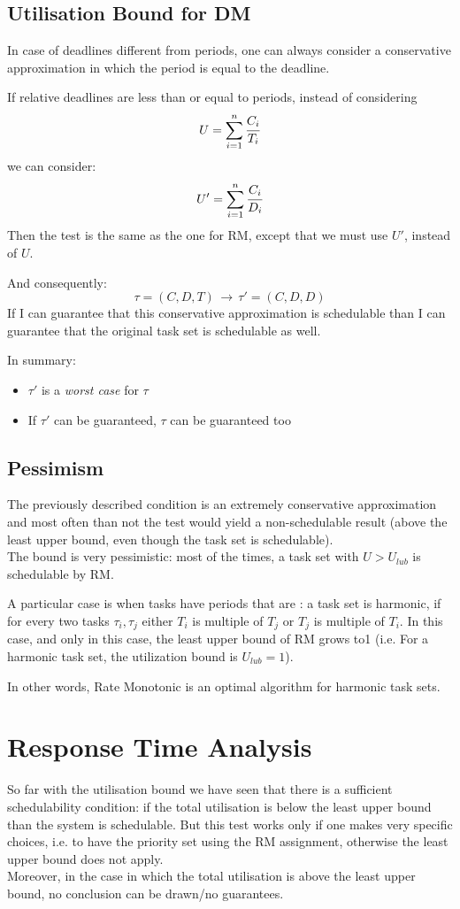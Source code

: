 \subsection{Utilisation Bound for DM}
In case of deadlines different from periods, one can always consider a conservative approximation in which the period is equal to the deadline. 

If relative deadlines are less than or equal to periods, instead of considering 
\[U = \sum_{i=1}^n \cfrac{C_i}{T_i}\]
we can consider:
\[U' = \sum_{i=1}^n \cfrac{C_i}{D_i}\]
Then the test is the same as the one for RM, except that we must use $U'$, instead of $U$.

And consequently:
\[\tau = (C,D,T)\,\rightarrow\,\tau' = (C,D,D)\]
If I can guarantee that this conservative approximation is schedulable than I can guarantee that the original task set is schedulable as well.

In summary:
\begin{itemize}
\item $\tau'$ is a \emph{worst case} for $\tau$
\item If $\tau'$ can be guaranteed, $\tau$ can be guaranteed too
\end{itemize}

\subsection{Pessimism}

The previously described condition is an extremely conservative approximation and most often than not the test would yield a non-schedulable result (above the least upper bound, even though the task set is schedulable).\\
The bound is very pessimistic: most of the times, a task set with $U > U_{lub}$ is schedulable by RM.

A particular case is when tasks have periods that are : a task set is harmonic, if for every two tasks $\tau_i, \tau_j$ either $T_i$ is multiple of $T_j$ or $T_j$ is multiple of $T_i$. In this case, and only in this case, the least upper bound of RM grows to1 (i.e. For a harmonic task set, the utilization bound is $U_{lub} = 1$).

In other words, Rate Monotonic is an optimal algorithm for harmonic task sets.

\section{Response Time Analysis}
So far with the utilisation bound we have seen that there is a sufficient schedulability condition: if the total utilisation is below the least upper bound than the system is schedulable. But this test works only if one makes very specific choices, i.e. to have the priority set using the RM assignment, otherwise the least upper bound does not apply.\\
Moreover, in the case in which the total utilisation is above the least upper bound, no conclusion can be drawn/no guarantees.

